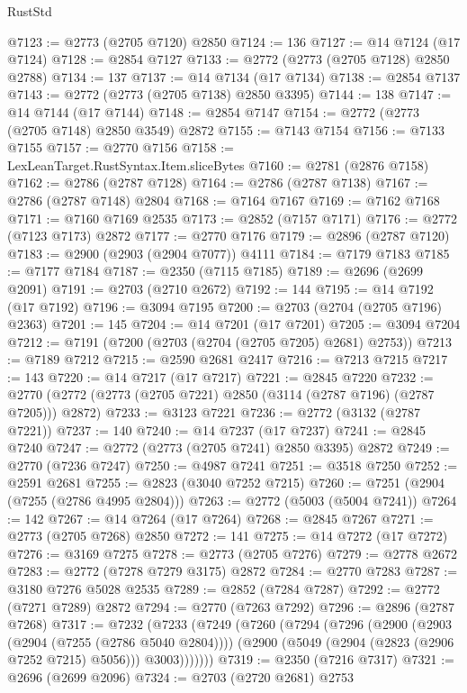 \begin{lexlean}{RustStd}
\begin{coremodule}
@7123 := @2773 (@2705 @7120) @2850
@7124 := 136
@7127 := @14 @7124 (@17 @7124)
@7128 := @2854 @7127
@7133 := @2772 (@2773 (@2705 @7128) @2850 @2788)
@7134 := 137
@7137 := @14 @7134 (@17 @7134)
@7138 := @2854 @7137
@7143 := @2772 (@2773 (@2705 @7138) @2850 @3395)
@7144 := 138
@7147 := @14 @7144 (@17 @7144)
@7148 := @2854 @7147
@7154 := @2772 (@2773 (@2705 @7148) @2850 @3549) @2872
@7155 := @7143 @7154
@7156 := @7133 @7155
@7157 := @2770 @7156
@7158 := LexLeanTarget.RustSyntax.Item.sliceBytes
@7160 := @2781 (@2876 @7158)
@7162 := @2786 (@2787 @7128)
@7164 := @2786 (@2787 @7138)
@7167 := @2786 (@2787 @7148) @2804
@7168 := @7164 @7167
@7169 := @7162 @7168
@7171 := @7160 @7169 @2535
@7173 := @2852 (@7157 @7171)
@7176 := @2772 (@7123 @7173) @2872
@7177 := @2770 @7176
@7179 := @2896 (@2787 @7120)
@7183 := @2900 (@2903 (@2904 @7077)) @4111
@7184 := @7179 @7183
@7185 := @7177 @7184
@7187 := @2350 (@7115 @7185)
@7189 := @2696 (@2699 @2091)
@7191 := @2703 (@2710 @2672)
@7192 := 144
@7195 := @14 @7192 (@17 @7192)
@7196 := @3094 @7195
@7200 := @2703 (@2704 (@2705 @7196) @2363)
@7201 := 145
@7204 := @14 @7201 (@17 @7201)
@7205 := @3094 @7204
@7212 := @7191 (@7200 (@2703 (@2704 (@2705 @7205) @2681) @2753))
@7213 := @7189 @7212
@7215 := @2590 @2681 @2417
@7216 := @7213 @7215
@7217 := 143
@7220 := @14 @7217 (@17 @7217)
@7221 := @2845 @7220
@7232 := @2770 (@2772 (@2773 (@2705 @7221) @2850 (@3114 (@2787 @7196) (@2787 @7205))) @2872)
@7233 := @3123 @7221
@7236 := @2772 (@3132 (@2787 @7221))
@7237 := 140
@7240 := @14 @7237 (@17 @7237)
@7241 := @2845 @7240
@7247 := @2772 (@2773 (@2705 @7241) @2850 @3395) @2872
@7249 := @2770 (@7236 @7247)
@7250 := @4987 @7241
@7251 := @3518 @7250
@7252 := @2591 @2681
@7255 := @2823 (@3040 @7252 @7215)
@7260 := @7251 (@2904 (@7255 (@2786 @4995 @2804)))
@7263 := @2772 (@5003 (@5004 @7241))
@7264 := 142
@7267 := @14 @7264 (@17 @7264)
@7268 := @2845 @7267
@7271 := @2773 (@2705 @7268) @2850
@7272 := 141
@7275 := @14 @7272 (@17 @7272)
@7276 := @3169 @7275
@7278 := @2773 (@2705 @7276)
@7279 := @2778 @2672
@7283 := @2772 (@7278 @7279 @3175) @2872
@7284 := @2770 @7283
@7287 := @3180 @7276 @5028 @2535
@7289 := @2852 (@7284 @7287)
@7292 := @2772 (@7271 @7289) @2872
@7294 := @2770 (@7263 @7292)
@7296 := @2896 (@2787 @7268)
@7317 := @7232
    (@7233
      (@7249
        (@7260
          (@7294
            (@7296
              (@2900
                (@2903 (@2904 (@7255 (@2786 @5040 @2804))))
                (@2900 (@5049 (@2904 (@2823 (@2906 @7252 @7215) @5056))) @3003)))))))
@7319 := @2350 (@7216 @7317)
@7321 := @2696 (@2699 @2096)
@7324 := @2703 (@2720 @2681) @2753

\end{coremodule}
\end{lexlean}
